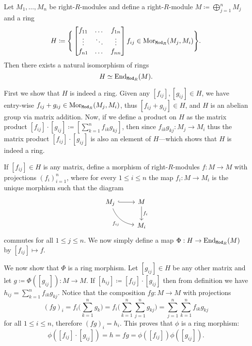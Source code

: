 \begin{example}
    \label{exp:matrix-of-morphisms}
    Let \(M_1, \dots, M_n\) be right-\(R\)-modules and define a right-\(R\)-module
    \(M \coloneq \bigoplus_{j=1}^n M_j\) and a ring
    \[
        H \coloneq \Bigg\{
        \begin{bmatrix}
            f_{1 1} & \dots  & f_{1 n} \\
            \vdots  & \ddots & \vdots  \\
            f_{n 1} & \dots  & f_{n n}
        \end{bmatrix}
        \relax f_{i j} \in \operatorname{Mor}_{{\texttt{Mod}_{R}}}(M_j, M_i)
        \Bigg\}.
    \]
    Then there exists a natural isomorphism of rings
    \[
        H \simeq \operatorname{End}_{{\texttt{Mod}_{R}}}(M).
    \]

    First we show that \(H\) is indeed a ring. Given any
    \([f_{i j}], [g_{ij}] \in H\), we have entry-wise
    \(f_{i j} + g_{i j} \in \operatorname{Mor}_{{\texttt{Mod}_{R}}}(M_j, M_i)\), thus
    \([f_{i j} + g_{i j}] \in H\), and \(H\) is an abelian group via matrix
    addition. Now, if we define a product on \(H\) as the matrix product
    \([f_{ij}] \cdot [g_{ij}] \coloneq [\sum_{k=1}^n f_{i k} g_{k j}]\), then since
    \(f_{i k} g_{k j}: M_j \to M_i\) thus the matrix product
    \([f_{i j}] \cdot [g_{ij}]\) is also an element of \(H\)---which shows that
    \(H\) is indeed a ring.

    If \([f_{i j}] \in H\) is any matrix, define a morphism of right-\(R\)-modules
    \(f: M \to M\) with projections \((f_i)_{i=1}^n\), where for every
    \(1 \leq i \leq n\) the map \(f_i: M \to M_i\) is the unique morphism such that
    the diagram
    \[
        \begin{tikzcd}
            M_j \ar[r, hook] \ar[rd, bend right, "f_{ij}"'] &M \ar[d, "f_i"] \\
            &M_i
        \end{tikzcd}
    \]
    commutes for all \(1 \leq j \leq n\). We now simply define a map \(\Phi: H \to
    \operatorname{End}_{{\texttt{Mod}_{R}}}(M)\) by \([f_{ij}] \mapsto f\).

    We now show that \(\Phi\) is a ring morphism. Let \([g_{ij}] \in H\) be any
    other matrix and let \(g \coloneq \Phi([g_{ij}]): M \to M\). If
    \([h_{ij}] \coloneq [f_{i j}] \cdot [g_{i j}]\) then from definition we have
    \(h_{ij} = \sum_{k=1}^n f_{i k} g_{k j}\). Notice that the composition \(f g: M
    \to M\) with projections
    \[
        (f g)_i = f_i\bigg(\sum_{k=1}^n g_k\bigg)
        = f_i \bigg(\sum_{k=1}^n \sum_{j=1}^n g_{k j} \bigg)
        = \sum_{j=1}^n \sum_{k=1}^n f_{i k} g_{k j}
    \]
    for all \(1 \leq i \leq n\), therefore \((f g)_i = h_i\). This proves that
    \(\phi\) is a ring morphism:
    \[
        \phi([f_{i j}] \cdot [g_{i j}]) = h = f g = \phi([f_{i j}]) \phi([g_{i j}]).
    \]


\end{example}
